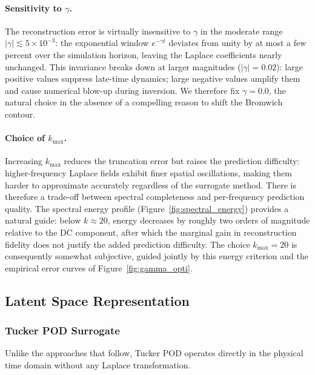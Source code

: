 \documentclass[a4paper, twocolumn]{article}
\begin{document}
\paragraph{Sensitivity to $\gamma$.}
The reconstruction error is virtually insensitive to $\gamma$ in the moderate range $|\gamma| \lesssim 5 \times 10^{-3}$: the exponential window $e^{-\gamma t}$ deviates from unity by at most a few percent over the simulation horizon, leaving the Laplace coefficients nearly unchanged. This invariance breaks down at larger magnitudes ($|\gamma| = 0.02$): large positive values suppress late-time dynamics; large negative values amplify them and cause numerical blow-up during inversion. We therefore fix $\gamma = 0.0$, the natural choice in the absence of a compelling reason to shift the Bromwich contour.

\paragraph{Choice of $k_{\max}$.}
Increasing $k_{\max}$ reduces the truncation error but raises the prediction difficulty: higher-frequency Laplace fields exhibit finer spatial oscillations, making them harder to approximate accurately regardless of the surrogate method. There is therefore a trade-off between spectral completeness and per-frequency prediction quality. The spectral energy profile (Figure~\ref{fig:spectral_energy}) provides a natural guide: below $k \approx 20$, energy decreases by roughly two orders of magnitude relative to the DC component, after which the marginal gain in reconstruction fidelity does not justify the added prediction difficulty. The choice $k_{\max} = 20$ is consequently somewhat subjective, guided jointly by this energy criterion and the empirical error curves of Figure~\ref{fig:gamma_opti}.

\subsection{Latent Space Representation}

\subsubsection{Tucker POD Surrogate}

Unlike the approaches that follow, Tucker POD operates directly in the physical time domain without any Laplace transformation.
\end{document}
